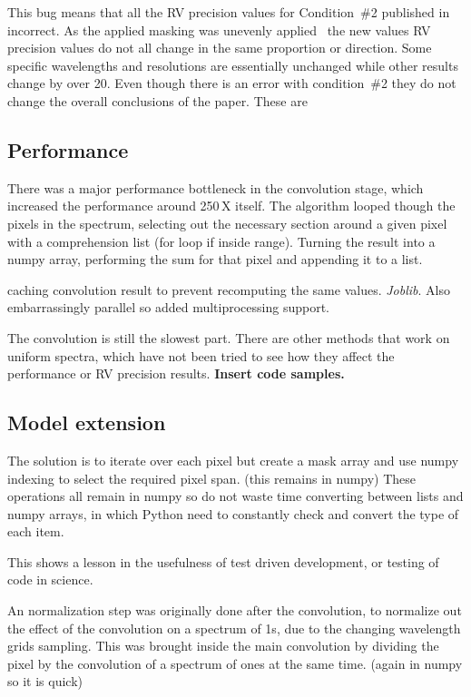 This bug means that all the {RV} precision values for Condition~\#2 published in~\citet{figueira_radial_2016} incorrect. As the applied masking was unevenly applied~\citet{figueira_radial_2016} the new values {RV} precision values do not all change in the same proportion or direction. Some specific wavelengths and resolutions are essentially unchanged while other results change by over 20\mps{}.  Even though there is an error with condition~\#2 they do not change the overall conclusions of the paper. These are 

 \subsection{Performance}
    There was a major performance bottleneck in the convolution stage, which increased the performance around 250\,X itself. The algorithm looped though the pixels in the spectrum, selecting out the necessary section around a given pixel with a comprehension list (for loop if inside range). Turning the result into a numpy array, performing the sum for that pixel and appending it to a list.


caching convolution result to prevent recomputing the same values. \emph{Joblib}.  Also embarrassingly parallel so added multiprocessing support.

The convolution is still the slowest part. There are other methods that work on uniform spectra, which have not been tried to see how they affect the performance or {RV} precision results.
\textbf{Insert code samples.}


\subsection{Model extension}
The solution is to iterate over each pixel but create a mask array and use numpy indexing to select the required pixel span. (this remains in numpy)
These operations all remain in numpy so do not waste time converting between lists and numpy arrays, in which Python need to constantly check and convert the type of each item.

This shows a lesson in the usefulness of test driven development, or testing of code in science.


An normalization step was originally done after the convolution, to normalize out the effect of the convolution on a spectrum of 1s, due to the changing wavelength grids sampling. This was brought inside the main convolution by dividing the pixel by the convolution of a spectrum of ones at the same time. (again in numpy so it is quick)

